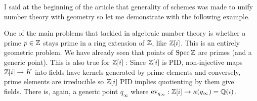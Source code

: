 \begin{eg}

  I said at the beginning of the article that 
  generality of schemes was made to unify number theory with geometry so
  let me demonstrate with the following example.
  
  One of the main problems that tackled in algebraic number theory is 
  whether a prime $p \in \mathbb{Z}$ stays prime in a ring extension of $\mathbb{Z}$,
  like $\mathbb{Z}[i]$.
  This is an entirely geometric problem. 
  We have already seen that points of $\operatorname{Spec} \mathbb{Z}$ are primes 
  (and a generic point). 
  This is also true for $\mathbb{Z}[i]$ : 
  Since $\mathbb{Z}[i]$ is PID, 
  non-injective maps $\mathbb{Z}[i] \to K$ into fields have 
  kernels generated by prime elements
  and conversely, prime elements are irreducible 
  so $\mathbb{Z}[i]$ PID implies quotienting by them give fields. 
  There is, again, a generic point $q_\infty$
  where $\operatorname{ev}_{q_\infty} : \mathbb{Z}[i] \to \kappa(q_\infty) = \mathbb{Q}(i)$.


\end{eg}
